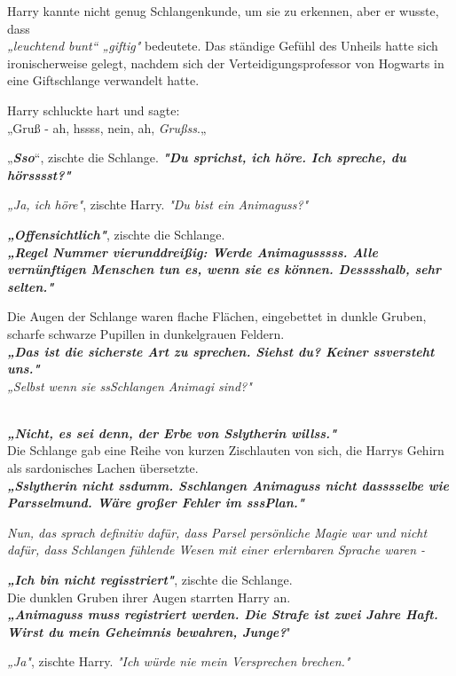{\hfill\break Harry kannte nicht genug Schlangenkunde, um sie zu erkennen, aber er wusste, dass\\ \emph{„leuchtend bunt“ „giftig"} bedeutete. Das ständige Gefühl des Unheils hatte sich ironischerweise gelegt, nachdem sich der Verteidigungsprofessor von Hogwarts in eine Giftschlange verwandelt hatte.

Harry schluckte hart und sagte:\\ „Gruß - ah, hssss, nein, ah, \emph{Grußss}.„

„\textbf{\emph{Sso}}“, zischte die Schlange. \textbf{\emph{"Du sprichst, ich höre. Ich spreche, du hörsssst?"}}

\emph{„Ja, ich höre"}, zischte Harry. \emph{"Du bist ein Animaguss?"}

\textbf{\emph{„Offensichtlich"}}, zischte die Schlange.\\ \textbf{\emph{„Regel Nummer vierunddreißig: Werde Animagusssss. Alle vernünftigen Menschen tun es, wenn sie es können. Desssshalb, sehr selten."}}

Die Augen der Schlange waren flache Flächen, eingebettet in dunkle Gruben, scharfe schwarze Pupillen in dunkelgrauen Feldern.\\ \textbf{\emph{„Das ist die sicherste Art zu sprechen. Siehst du? Keiner ssversteht uns."}}\\ \emph{\hfill\break „Selbst wenn sie ssSchlangen Animagi sind?"\\ }\strut \\ \textbf{\emph{„Nicht, es sei denn, der Erbe von Sslytherin willss."}}\\ Die Schlange gab eine Reihe von kurzen Zischlauten von sich, die Harrys Gehirn als sardonisches Lachen übersetzte.\\ \textbf{\emph{„Sslytherin nicht ssdumm. Sschlangen Animaguss nicht dasssselbe wie Parsselmund. Wäre großer Fehler im sssPlan."}}

\emph{Nun, das sprach definitiv dafür, dass Parsel persönliche Magie war und nicht dafür, dass Schlangen fühlende Wesen mit einer erlernbaren Sprache waren -}

\textbf{\emph{„Ich bin nicht regisstriert"}}, zischte die Schlange.\\ Die dunklen Gruben ihrer Augen starrten Harry an.\\ \textbf{\emph{„Animaguss muss registriert werden. Die Strafe ist zwei Jahre Haft. Wirst du mein Geheimnis bewahren, Junge?}}"

\emph{„Ja"}, zischte Harry. \emph{"Ich würde nie mein Versprechen brechen."}

}
